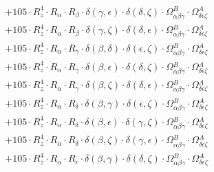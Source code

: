\documentclass{article}
\begin{document}
\begin{equation}
\begin{array}{c}
 \\[0.2em] 		 + 105 \cdot R_{z}^{4} \cdot R_{\alpha{}} \cdot R_{\beta{}} \cdot \delta{}\left(\gamma{}, \epsilon{}\right) \cdot \delta{}\left(\delta{}, \zeta{}\right) \cdot \Omega{}^{B}_{\alpha{}\beta{}\gamma{}} \cdot \Omega{}^{A}_{\delta{}\epsilon{}\zeta{}} 
 \\[0.2em] 		 + 105 \cdot R_{z}^{4} \cdot R_{\alpha{}} \cdot R_{\beta{}} \cdot \delta{}\left(\gamma{}, \zeta{}\right) \cdot \delta{}\left(\delta{}, \epsilon{}\right) \cdot \Omega{}^{B}_{\alpha{}\beta{}\gamma{}} \cdot \Omega{}^{A}_{\delta{}\epsilon{}\zeta{}} 
 \\[0.2em] 		 + 105 \cdot R_{z}^{4} \cdot R_{\alpha{}} \cdot R_{\gamma{}} \cdot \delta{}\left(\beta{}, \delta{}\right) \cdot \delta{}\left(\epsilon{}, \zeta{}\right) \cdot \Omega{}^{B}_{\alpha{}\beta{}\gamma{}} \cdot \Omega{}^{A}_{\delta{}\epsilon{}\zeta{}} 
 \\[0.2em] 		 + 105 \cdot R_{z}^{4} \cdot R_{\alpha{}} \cdot R_{\gamma{}} \cdot \delta{}\left(\beta{}, \epsilon{}\right) \cdot \delta{}\left(\delta{}, \zeta{}\right) \cdot \Omega{}^{B}_{\alpha{}\beta{}\gamma{}} \cdot \Omega{}^{A}_{\delta{}\epsilon{}\zeta{}} 
 \\[0.2em] 		 + 105 \cdot R_{z}^{4} \cdot R_{\alpha{}} \cdot R_{\gamma{}} \cdot \delta{}\left(\beta{}, \zeta{}\right) \cdot \delta{}\left(\delta{}, \epsilon{}\right) \cdot \Omega{}^{B}_{\alpha{}\beta{}\gamma{}} \cdot \Omega{}^{A}_{\delta{}\epsilon{}\zeta{}} 
 \\[0.2em] 		 + 105 \cdot R_{z}^{4} \cdot R_{\alpha{}} \cdot R_{\delta{}} \cdot \delta{}\left(\beta{}, \gamma{}\right) \cdot \delta{}\left(\epsilon{}, \zeta{}\right) \cdot \Omega{}^{B}_{\alpha{}\beta{}\gamma{}} \cdot \Omega{}^{A}_{\delta{}\epsilon{}\zeta{}} 
 \\[0.2em] 		 + 105 \cdot R_{z}^{4} \cdot R_{\alpha{}} \cdot R_{\delta{}} \cdot \delta{}\left(\beta{}, \epsilon{}\right) \cdot \delta{}\left(\gamma{}, \zeta{}\right) \cdot \Omega{}^{B}_{\alpha{}\beta{}\gamma{}} \cdot \Omega{}^{A}_{\delta{}\epsilon{}\zeta{}} 
 \\[0.2em] 		 + 105 \cdot R_{z}^{4} \cdot R_{\alpha{}} \cdot R_{\delta{}} \cdot \delta{}\left(\beta{}, \zeta{}\right) \cdot \delta{}\left(\gamma{}, \epsilon{}\right) \cdot \Omega{}^{B}_{\alpha{}\beta{}\gamma{}} \cdot \Omega{}^{A}_{\delta{}\epsilon{}\zeta{}} 
 \\[0.2em] 		 + 105 \cdot R_{z}^{4} \cdot R_{\alpha{}} \cdot R_{\epsilon{}} \cdot \delta{}\left(\beta{}, \gamma{}\right) \cdot \delta{}\left(\delta{}, \zeta{}\right) \cdot \Omega{}^{B}_{\alpha{}\beta{}\gamma{}} \cdot \Omega{}^{A}_{\delta{}\epsilon{}\zeta{}} 

\end{array}
\end{equation}
\end{document}
